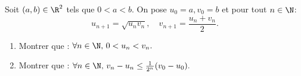 



\begin{exercice}
Soit $(a, b) \in \R^2$ tels que $0<a<b.$ On pose $u_0=a, v_0=b$ et pour tout $n\in \N$:
$$ u_{n+1} =\sqrt{u_n v_n}, \quad v_{n+1} = \frac{u_n +v_n}{2}.$$
\begin{enumerate}
\item Montrer que :  $\forall n\in \N, \, 0<u_n<v_n.$
\item Montrer que :  $\forall n\in \N, \, v_n-u_n\leq \frac{1}{2^n}(v_0-u_0).$
\end{enumerate}
\end{exercice}


